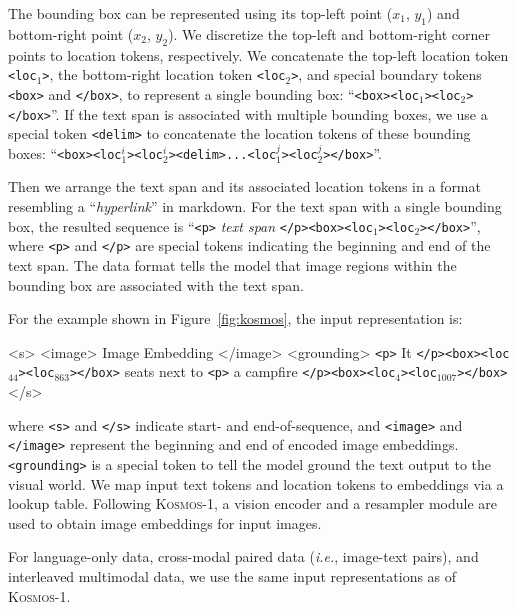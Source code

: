 \documentclass{article}
\newcommand\kosmos{\textsc{Kosmos-1}}
\newcommand\ie{\textit{i.e.}}
\begin{document}
The bounding box can be represented using its top-left point ($x_1$, $y_1$) and bottom-right point ($x_2$, $y_2$).
We discretize the top-left and bottom-right corner points to location tokens, respectively.
We concatenate the top-left location token \texttt{<loc$_1$>}, the bottom-right location token \texttt{<loc$_2$>}, and special boundary tokens \texttt{<box>} and \texttt{</box>}, to represent a single bounding box: ``\texttt{<box>}\texttt{<loc$_1$><loc$_2$>}\texttt{</box>}''.
If the text span is associated with multiple bounding boxes, we use a special token \texttt{<delim>} to concatenate the location tokens of these bounding boxes: ``\texttt{<box>}\texttt{<loc$_1^i$><loc$_2^i$><delim>...<loc$_1^j$><loc$_2^j$>}\texttt{</box>}''.

Then we arrange the text span and its associated location tokens in a format resembling a ``\textit{hyperlink}'' in markdown.
For the text span with a single bounding box, the resulted sequence is  ``\texttt{<p>} \textit{text span} \texttt{</p>}\texttt{<box>}\texttt{<loc$_1$>}\texttt{<loc$_2$>}\texttt{</box>}'', where \texttt{<p>} and \texttt{</p>} are special tokens indicating the beginning and end of the text span.
The data format tells the model that image regions within the bounding box are associated with the text span.

For the example shown in Figure~\ref{fig:kosmos}, the input representation is:

\begin{minipage}{0.99\columnwidth}
\begin{tcolorbox} 
\small
<s> <image> Image Embedding </image> <grounding> \texttt{<p>} It \texttt{</p>}\texttt{<box>}\texttt{<loc$_{44}$>}\texttt{<loc$_{863}$>}\texttt{</box>} seats next to \texttt{<p>} a campfire \texttt{</p>}\texttt{<box>}\texttt{<loc$_4$>}\texttt{<loc$_{1007}$>}\texttt{</box>}  </s>
\end{tcolorbox}
\vspace{1mm}
\end{minipage}
where \texttt{<s>} and \texttt{</s>} indicate start- and end-of-sequence, and \texttt{<image>} and \texttt{</image>} represent the beginning and end of encoded image embeddings.
\texttt{<grounding>} is a special token to tell the model ground the text output to the visual world.
We map input text tokens and location tokens to embeddings via a lookup table.
Following \kosmos{}, a vision encoder and a resampler module are used to obtain image embeddings for input images.

For language-only data, cross-modal paired data (\ie, image-text pairs), and interleaved multimodal data, we use the same input representations as of \kosmos{}.
\end{document}
